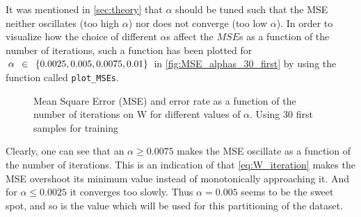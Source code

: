 \documentclass{article}
\begin{document}
It was mentioned in \autoref{sec:theory} that $\alpha$ should be tuned such that the MSE neither
oscillates (too high $\alpha$) nor does not converge (too low $\alpha$). In order to visualize
how the choice of different $\alpha$s affect the $MSE$s as a function of the number of iterations,
such a function has been plotted for $\alpha \enskip \in \enskip \{0.0025, 0.005, 0.0075, 0.01\}$
in \autoref{fig:MSE_alphas_30_first} by using the function called \lstinline{plot_MSEs}.

\begin{figure}
    \centering
    \caption{Mean Square Error (MSE) and error rate as a function of the number of iterations on W
    for different values of $\alpha$. Using 30 first samples for training}
\end{figure}

Clearly, one can see that an $\alpha \geq 0.0075$ makes the MSE oscillate as a function of the number
of iterations. This is an indication of that \eqref{eq:W_iteration} makes the MSE overshoot its
minimum value instead of monotonically approaching it. And for $\alpha \leq 0.0025$ it converges
too slowly. Thus $\alpha = 0.005$ seems to be the sweet spot, and so is the value which will be used
for this partitioning of the dataset.
\end{document}
